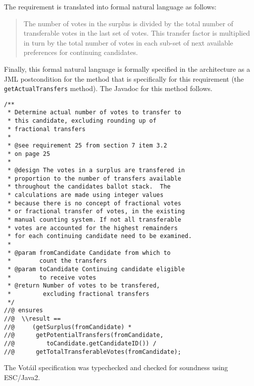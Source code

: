 \documentclass[times, 10pt, twocolumn]{article}
\newcommand{\Votail}{Vot{\'a}il\xspace}
\begin{document}
The requirement is translated into formal natural language as follows:
\begin{quote}
  The number of votes in the surplus is divided by the total number of
  transferable votes in the last set of votes. This transfer factor is
  multiplied in turn by the total number of votes in each sub-set of
  next available preferences for continuing candidates.
\end{quote}

Finally, this formal natural language is formally specified in the
architecture as a JML postcondition for the method that is
specifically for this requirement (the \texttt{getActualTransfers}
method).  The Javadoc for this method follows.

\footnotesize
\begin{verbatim}
/**
 * Determine actual number of votes to transfer to 
 * this candidate, excluding rounding up of 
 * fractional transfers
 *
 * @see requirement 25 from section 7 item 3.2 
 * on page 25
 *
 * @design The votes in a surplus are transfered in 
 * proportion to the number of transfers available 
 * throughout the candidates ballot stack.  The 
 * calculations are made using integer values 
 * because there is no concept of fractional votes 
 * or fractional transfer of votes, in the existing 
 * manual counting system. If not all transferable 
 * votes are accounted for the highest remainders 
 * for each continuing candidate need to be examined.
 *
 * @param fromCandidate Candidate from which to 
 *        count the transfers
 * @param toCandidate Continuing candidate eligible 
 *        to receive votes
 * @return Number of votes to be transfered, 
 *         excluding fractional transfers
 */
//@ ensures 
//@  \\result == 
//@     (getSurplus(fromCandidate) * 
//@      getPotentialTransfers(fromCandidate, 
//@         toCandidate.getCandidateID()) /
//@      getTotalTransferableVotes(fromCandidate);
\end{verbatim}
\normalsize

The \Votail specification was typechecked and checked for soundness using 
ESC/Java2.

\label{sec:acad-curr-work}

\label{subsubsec:gener-syst-non}
\end{document}
